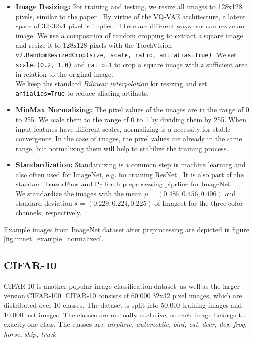     \begin{itemize}
        \item \textbf{Image Resizing:} For training and testing, we resize all images to 128x128 pixels, similar to the paper \cite{vqvae}. By virtue of the VQ-VAE architecture, a latent space of 32x32x1 pixel is implied.
        There are different ways one can resize an image. We use a composition of random cropping to extract a square image and resize it to 128x128 pixels with the TorchVision \texttt{v2.RandomResizedCrop(size, scale, ratio, antialias=True)}. We set \texttt{scale=(0.2, 1.0)} and \texttt{ratio=1} to crop a square image with a sufficient area in relation to the original image.\\
        We keep the standard \textit{Bilinear interpolation} for resizing and set \texttt{antialias=True} to reduce aliasing artifacts.

        \item \textbf{MinMax Normalizing:} The pixel values of the images are in the range of 0 to 255. We scale them to the range of 0 to 1 by dividing them by 255. When input features have different scales, normalizing is a necessity for stable convergence. In the case of images, the pixel values are already in the same range, but normalizing them will help to stabilize the training process.

        \item \textbf{Standardization:} Standardizing is a common step in machine learning and also often used for ImageNet, e.g. for training ResNet \cite{resnet}. It is also part of the standard TensorFlow and PyTorch preprocessing pipeline for ImageNet. \\
        We standardize the images with the mean $\mu = (0.485, 0.456, 0.406)$ and standard deviation $\sigma = (0.229, 0.224, 0.225)$ of Imageet for the three color channels, respectively.

    \end{itemize}

    Example images from ImageNet dataset after preprocessing are depicted in figure \ref{fig:imnet_example_normalized}.

    \subsection{CIFAR-10}
    CIFAR-10 \cite{cifar10} is another popular image classification dataset, as well as the larger version CIFAR-100. CIFAR-10 consists of 60.000 32x32 pixel images, which are distributed over 10 classes. The dataset is split into 50.000 training images and 10.000 test images. The classes are mutually exclusive, so each image belongs to exactly one class. The classes are: \textit{airplane, automobile, bird, cat, deer, dog, frog, horse, ship, truck}

